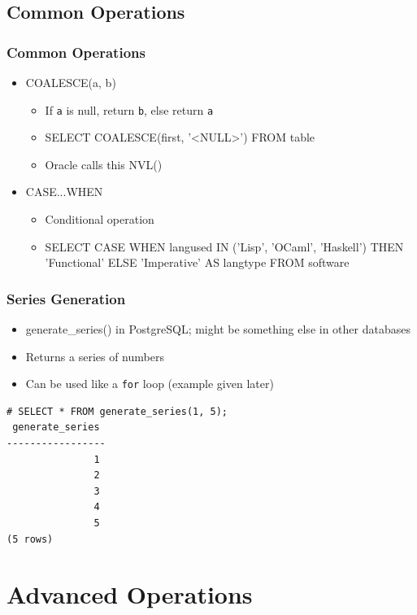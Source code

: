 \documentclass{beamer}
\begin{document}
\subsection{Common Operations}
\begin{frame}
    \frametitle{Common Operations}
    \begin{itemize}
        \item COALESCE(a, b)
        \pause
        \begin{itemize}
            \item If \texttt{a} is null, return \texttt{b}, else return \texttt{a}
            \pause
            \item SELECT COALESCE(first, '\textless NULL\textgreater ') FROM table
            \pause
            \item Oracle calls this NVL()
            \pause
        \end{itemize}
        \item CASE...WHEN
        \pause
        \begin{itemize}
            \item Conditional operation
            \pause
            \item SELECT CASE WHEN langused IN ('Lisp', 'OCaml', 'Haskell') THEN 'Functional' ELSE 'Imperative' AS langtype FROM software
        \end{itemize}
    \end{itemize}
\end{frame}

\begin{frame}[fragile]
    \frametitle{Series Generation}
    \begin{itemize}
        \item generate\_series() in PostgreSQL; might be something else in other databases
        \pause
        \item Returns a series of numbers
        \pause
        \item Can be used like a \texttt{for} loop (example given later)
    \end{itemize}
    \begin{verbatim}
# SELECT * FROM generate_series(1, 5);
 generate_series
-----------------
               1
               2
               3
               4
               5
(5 rows)
    \end{verbatim}
\end{frame}

\section{Advanced Operations}
\end{document}
